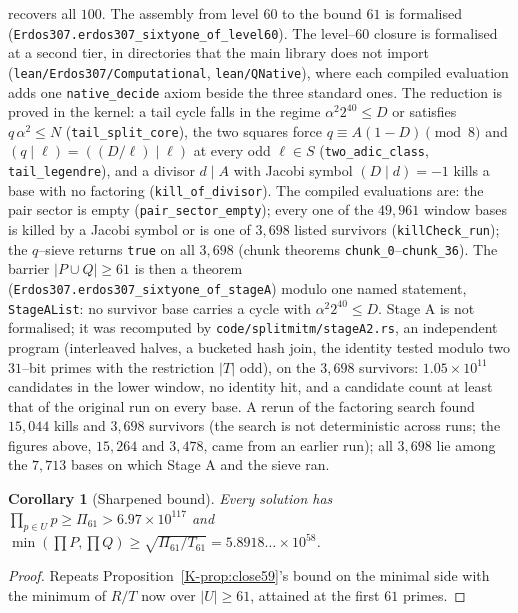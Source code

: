 \documentclass[11pt]{article}
\newtheorem{corollary}[theorem]{Corollary}
\theoremstyle{definition}
\begin{document}
recovers all $100$. The assembly from level $60$ to the bound $61$ is formalised
(\texttt{Erdos307.erdos307\_sixtyone\_of\_level60}).
The level--$60$ closure is formalised at a second tier, in directories that the main library does not import
(\texttt{lean/Erdos307/Computational}, \texttt{lean/QNative}), where each compiled evaluation adds one
\texttt{native\_decide} axiom beside the three standard ones. The reduction is proved in the kernel: a tail cycle falls in the
regime $\alpha^2 2^{40}\le D$ or satisfies $q\,\alpha^2\le N$ (\texttt{tail\_split\_core}), the two squares force
$q\equiv A(1-D)\pmod 8$ and $(q\mid\ell)=((D/\ell)\mid\ell)$ at every odd $\ell\in S$ (\texttt{two\_adic\_class},
\texttt{tail\_legendre}), and a divisor $d\mid A$ with Jacobi symbol $(D\mid d)=-1$ kills a base with no factoring
(\texttt{kill\_of\_divisor}). The compiled evaluations are: the pair sector is empty (\texttt{pair\_sector\_empty}); every one of
the $49{,}961$ window bases is killed by a Jacobi symbol or is one of $3{,}698$ listed survivors (\texttt{killCheck\_run});
the $q$--sieve returns \texttt{true} on all $3{,}698$ (chunk theorems \texttt{chunk\_0}--\texttt{chunk\_36}). The barrier
$|P\cup Q|\ge61$ is then a theorem (\texttt{Erdos307.erdos307\_sixtyone\_of\_stageA}) modulo one named statement,
\texttt{StageAList}: no survivor base carries a cycle with $\alpha^2 2^{40}\le D$. Stage A is not formalised; it was recomputed
by \texttt{code/splitmitm/stageA2.rs}, an independent program (interleaved halves, a bucketed hash join, the identity tested
modulo two $31$--bit primes with the restriction $|T|$ odd), on the $3{,}698$ survivors: $1.05\times10^{11}$ candidates in the
lower window, no identity hit, and a candidate count at least that of the original run on every base. A rerun of the
factoring search found $15{,}044$ kills and $3{,}698$ survivors (the search is not deterministic across runs; the figures
above, $15{,}264$ and $3{,}478$, came from an earlier run); all $3{,}698$ lie among the $7{,}713$ bases on which Stage A and
the sieve ran.


\begin{corollary}[Sharpened bound]\label{cor:level61bound}
Every solution has $\prod_{p\in U}p\ge\Pi_{61}>6.97\times10^{117}$ and
$\min(\prod P,\prod Q)\ge\sqrt{\Pi_{61}/T_{61}}=5.8918\ldots\times10^{58}$.
\end{corollary}
\begin{proof}
Repeats Proposition~\ref{K-prop:close59}'s bound on the minimal side with the minimum of $R/T$ now over $|U|\ge61$,
attained at the first $61$ primes.
\end{proof}
\end{document}
